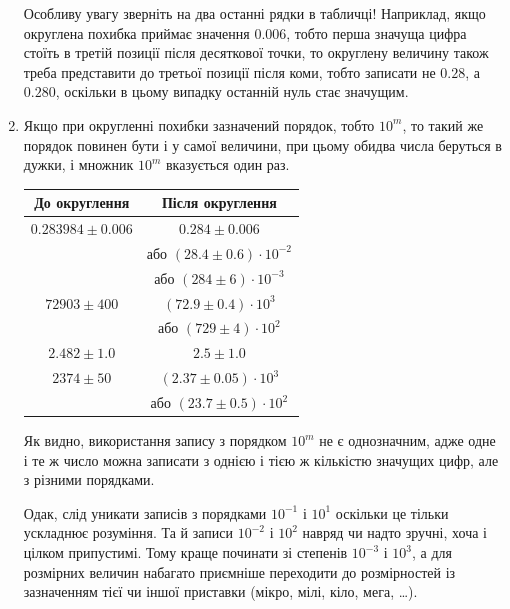 \documentclass{LabBook}
\begin{document}
\begin{enumerate}
	      \begin{Warning}
		      Особливу увагу зверніть на два останні рядки в табличці! Наприклад, якщо округлена похибка приймає значення $0.006$, тобто перша значуща цифра стоїть в третій позиції після десяткової точки, то округлену величину також треба представити до третьої позиції після коми, тобто записати не $0.28$, а $0.280$, оскільки в цьому випадку останній нуль стає значущим.
	      \end{Warning}
	\item Якщо при округленні похибки зазначений порядок, тобто $10^m$, то такий же порядок повинен бути і у самої величини, при цьому обидва числа беруться в дужки, і множник $10^m$ вказується один раз.
	      \begin{center}
		      \begin{tabular}{cc}
			      \toprule
			      До округлення      & Після округлення                  \\ \midrule
			      $0.283984\pm0.006$ & $0.284\pm 0.006$                  \\
			                         & або $(28.4 \pm 0.6)\cdot 10^{-2}$ \\
			                         & або $(284 \pm 6)\cdot 10^{-3}$    \\\midrule
			      $72903\pm400$      & $(72.9\pm0.4) \cdot 10^3$         \\
			                         & або $(729 \pm 4)\cdot 10^2$       \\\midrule
			      $2.482\pm1.0$      & $2.5\pm1.0$                       \\\midrule
			      $2374\pm50$        & $(2.37\pm0.05)\cdot 10^3$         \\
			                         & або $(23.7\pm0.5)\cdot 10^2$      \\ \bottomrule
		      \end{tabular}
	      \end{center}

	      Як видно, використання запису з порядком $10^m$ не є однозначним, адже одне і те ж число можна записати з однією і тією ж кількістю значущих цифр, але з різними порядками.

	      Одак, слід уникати записів з порядками $10^{-1}$ і $10^1$ оскільки це тільки ускладнює розуміння. Та й записи $10^{-2}$ і $10^2$ навряд чи надто зручні, хоча і цілком припустимі. Тому краще починати зі степенів $10^{-3}$ і $10^3$, а для розмірних величин набагато приємніше переходити до розмірностей із зазначенням тієї чи іншої приставки (мікро, мілі, кіло, мега, \ldots).
\end{enumerate}
\end{document}
